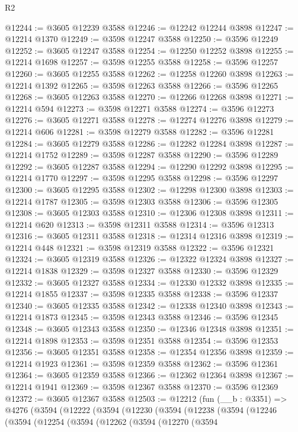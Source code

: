\begin{lexlean}{R2}
\begin{coremodule}
@12244 := @3605 @12239 @3588
@12246 := @12242 @12244 @3898
@12247 := @12214 @1370
@12249 := @3598 @12247 @3588
@12250 := @3596 @12249
@12252 := @3605 @12247 @3588
@12254 := @12250 @12252 @3898
@12255 := @12214 @1698
@12257 := @3598 @12255 @3588
@12258 := @3596 @12257
@12260 := @3605 @12255 @3588
@12262 := @12258 @12260 @3898
@12263 := @12214 @1392
@12265 := @3598 @12263 @3588
@12266 := @3596 @12265
@12268 := @3605 @12263 @3588
@12270 := @12266 @12268 @3898
@12271 := @12214 @594
@12273 := @3598 @12271 @3588
@12274 := @3596 @12273
@12276 := @3605 @12271 @3588
@12278 := @12274 @12276 @3898
@12279 := @12214 @606
@12281 := @3598 @12279 @3588
@12282 := @3596 @12281
@12284 := @3605 @12279 @3588
@12286 := @12282 @12284 @3898
@12287 := @12214 @1752
@12289 := @3598 @12287 @3588
@12290 := @3596 @12289
@12292 := @3605 @12287 @3588
@12294 := @12290 @12292 @3898
@12295 := @12214 @1770
@12297 := @3598 @12295 @3588
@12298 := @3596 @12297
@12300 := @3605 @12295 @3588
@12302 := @12298 @12300 @3898
@12303 := @12214 @1787
@12305 := @3598 @12303 @3588
@12306 := @3596 @12305
@12308 := @3605 @12303 @3588
@12310 := @12306 @12308 @3898
@12311 := @12214 @620
@12313 := @3598 @12311 @3588
@12314 := @3596 @12313
@12316 := @3605 @12311 @3588
@12318 := @12314 @12316 @3898
@12319 := @12214 @448
@12321 := @3598 @12319 @3588
@12322 := @3596 @12321
@12324 := @3605 @12319 @3588
@12326 := @12322 @12324 @3898
@12327 := @12214 @1838
@12329 := @3598 @12327 @3588
@12330 := @3596 @12329
@12332 := @3605 @12327 @3588
@12334 := @12330 @12332 @3898
@12335 := @12214 @1855
@12337 := @3598 @12335 @3588
@12338 := @3596 @12337
@12340 := @3605 @12335 @3588
@12342 := @12338 @12340 @3898
@12343 := @12214 @1873
@12345 := @3598 @12343 @3588
@12346 := @3596 @12345
@12348 := @3605 @12343 @3588
@12350 := @12346 @12348 @3898
@12351 := @12214 @1898
@12353 := @3598 @12351 @3588
@12354 := @3596 @12353
@12356 := @3605 @12351 @3588
@12358 := @12354 @12356 @3898
@12359 := @12214 @1923
@12361 := @3598 @12359 @3588
@12362 := @3596 @12361
@12364 := @3605 @12359 @3588
@12366 := @12362 @12364 @3898
@12367 := @12214 @1941
@12369 := @3598 @12367 @3588
@12370 := @3596 @12369
@12372 := @3605 @12367 @3588
@12503 := @12212
    (fun (__b : @3351) =>
    @4276
      (@3594
        (@12222
          (@3594
            (@12230
              (@3594
                (@12238
                  (@3594
                    (@12246
                      (@3594
                        (@12254
                          (@3594
                            (@12262
                              (@3594
                                (@12270
                                  (@3594

\end{coremodule}
\end{lexlean}
